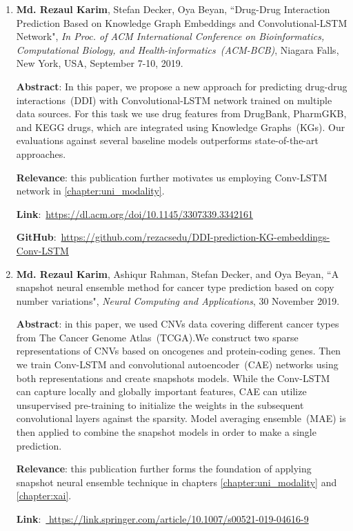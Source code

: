 \begin{enumerate}
	\item \textbf{Md. Rezaul Karim}, Stefan Decker, Oya Beyan, ``Drug-Drug Interaction Prediction Based on Knowledge Graph Embeddings and Convolutional-LSTM Network", \emph{In Proc. of ACM International Conference on Bioinformatics, Computational Biology, and Health-informatics~(ACM-BCB)}, Niagara Falls, New York, USA, September 7-10, 2019.
	
	\textbf{Abstract}: In this paper, we propose a new approach for predicting drug-drug interactions~(DDI) with Convolutional-LSTM network trained on multiple data sources. For this task we use drug features from DrugBank, PharmGKB, and KEGG drugs, which are integrated using Knowledge Graphs~(KGs). Our evaluations against several baseline models outperforms state-of-the-art approaches. 
	
	\textbf{Relevance}: this publication further motivates us employing Conv-LSTM network in \cref{chapter:uni_modality}.
	
	\textbf{Link}:~\url{https://dl.acm.org/doi/10.1145/3307339.3342161}

	\textbf{GitHub}:~\url{https://github.com/rezacsedu/DDI-prediction-KG-embeddings-Conv-LSTM}
	
	\item \textbf{Md. Rezaul Karim}, Ashiqur Rahman, Stefan Decker, and Oya Beyan, ``A snapshot neural ensemble method for cancer type prediction based on copy number variations", \emph{Neural Computing and Applications}, 30 November 2019. 
	
	\textbf{Abstract}: in this paper, we used CNVs data covering different cancer types from The Cancer Genome Atlas~(TCGA).We construct two sparse representations of CNVs based on oncogenes and protein-coding genes. Then we train Conv-LSTM and convolutional autoencoder~(CAE) networks using both representations and create snapshots models. While the Conv-LSTM can capture locally and globally important features, CAE can utilize unsupervised pre-training to initialize the weights in the subsequent convolutional layers against the sparsity. Model averaging ensemble~(MAE) is then applied to combine the snapshot models in order to make a single prediction. 
	
	\textbf{Relevance}: this publication further forms the foundation of applying snapshot neural ensemble technique in chapters \ref{chapter:uni_modality} and \ref{chapter:xai}.
	
	\textbf{Link}:~\url{	https://link.springer.com/article/10.1007/s00521-019-04616-9}
	

\end{enumerate}
